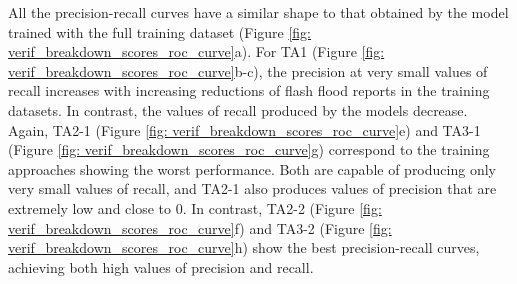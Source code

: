 \begin{figure}[htbp]
\label{fig:verif_breakdown_scores_roc_curve}
\end{figure}

All  the precision-recall curves have a similar shape to that obtained by the model trained with the full training dataset (Figure \ref{fig: verif_breakdown_scores_roc_curve}a). For TA1 (Figure \ref{fig: verif_breakdown_scores_roc_curve}b-c), the precision at very small values of recall increases with increasing reductions of flash flood reports in the training datasets. In contrast, the values of recall produced by the models decrease. Again, TA2-1 (Figure \ref{fig: verif_breakdown_scores_roc_curve}e) and TA3-1 (Figure \ref{fig: verif_breakdown_scores_roc_curve}g) correspond to the training approaches showing the worst performance. Both are capable of producing only very small values of recall, and TA2-1 also produces values of precision that are extremely low and close to 0. In contrast, TA2-2 (Figure \ref{fig: verif_breakdown_scores_roc_curve}f) and TA3-2 (Figure \ref{fig: verif_breakdown_scores_roc_curve}h) show the best precision-recall curves, achieving both high values of precision and recall. 

